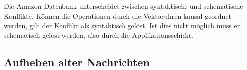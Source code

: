 Die Amazon Datenbank unterscheidet zwischen syntaktische und schematische Konflikte.
Können die Operationen durch die Vektoruhren kausal geordnet werden, gilt der Konflikt als syntaktisch gelöst.
Ist dies nicht möglich muss er schematisch gelöst werden, also durch die Applikationsschicht.


\subsection{Aufheben alter Nachrichten}




